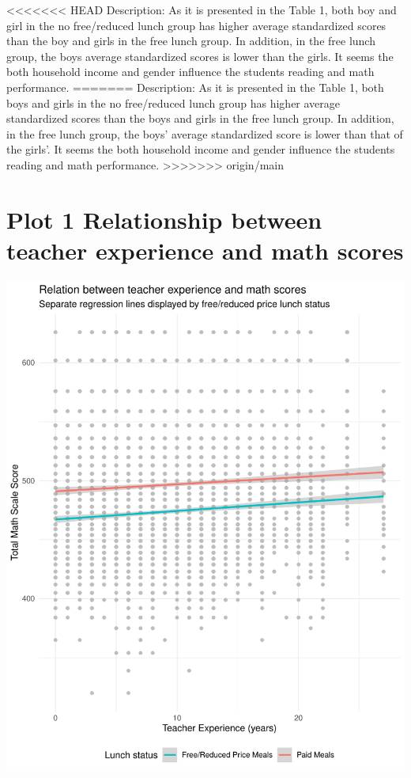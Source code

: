 \documentclass[
  letterpaper,
  DIV=11,
  numbers=noendperiod]{scrartcl}
\begin{document}
<<<<<<< HEAD
Description: As it is presented in the Table 1, both boy and girl in the
no free/reduced lunch group has higher average standardized scores than
the boy and girls in the free lunch group. In addition, in the free
lunch group, the boys average standardized scores is lower than the
girls. It seems the both household income and gender influence the
students reading and math performance.
=======
Description: As it is presented in the Table 1, both boys and girls in
the no free/reduced lunch group has higher average standardized scores
than the boys and girls in the free lunch group. In addition, in the
free lunch group, the boys' average standardized score is lower than
that of the girls'. It seems the both household income and gender
influence the students reading and math performance.
>>>>>>> origin/main

\section{Plot 1 Relationship between teacher experience and math
scores}\label{plot-1-relationship-between-teacher-experience-and-math-scores}

\includegraphics{HW6v2_files/figure-pdf/unnamed-chunk-4-1.pdf}
\end{document}
